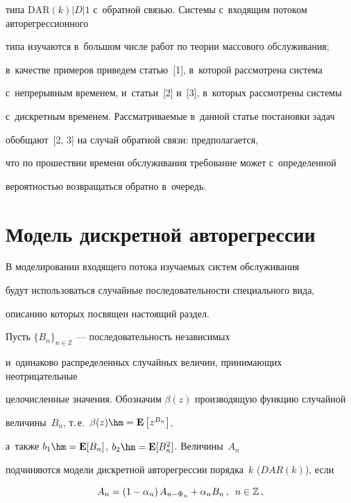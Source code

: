 типа $\mathrm{DAR}\left(k\right)|D|1$ с~обратной связью. Системы с~входящим потоком авторегрессионного

типа изучаются в~большом числе работ по теории массового обслуживания;

в~качестве примеров приведем статью~[1], в~которой рассмотрена система

с~непрерывным временем, и~статьи~[2] и~[3], в~которых рассмотрены системы

с~дискретным временем. Рассматриваемые в~данной статье постановки задач

обобщают~[2, 3] на случай обратной связи: предполагается,

что по прошествии времени обслуживания требование может с~определенной

вероятностью возвращаться обратно в~очередь.



\section{Модель дискретной авторегрессии}



В моделировании входящего потока изучаемых систем обслуживания

будут использоваться случайные последовательности специального вида,

описанию которых посвящен настоящий раздел.



Пусть $\{B_n\}_{n\in\mathbb{Z}}$ --- последовательность независимых

и~одинаково распределенных случайных величин, принимающих неотрицательные

целочисленные значения. Обозначим $\beta(z)$ производящую функцию случайной

величины~$B_n$, т.\,е.\ $\beta(z)\hm=\mathbf{E}\left[z^{B_n}\right]$,

а~также $b_1\hm=\mathbf{E}[B_n]$, $b_2\hm=\mathbf{E}[B_n^2]$. Величины~$A_n$

подчиняются модели дискретной авторегрессии порядка~$k$ ($DAR(k)$), если

\begin{equation*}


A_{n}=\left(1-\alpha_n\right)A_{n-\Phi_n}+\alpha_n B_n\,,\enskip n\in\mathbb{Z}\,,

\end{equation*}

